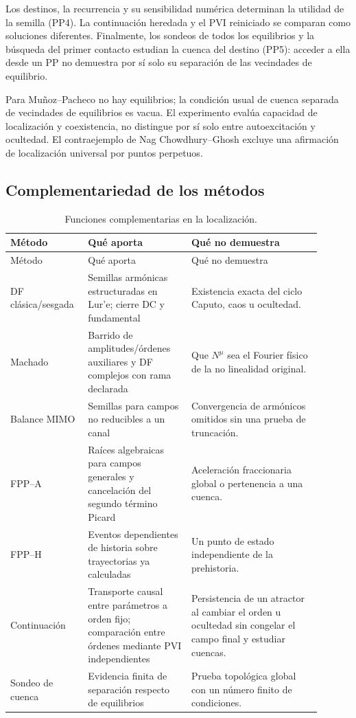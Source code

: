 Los destinos, la recurrencia y su sensibilidad numérica determinan la
utilidad de la semilla (PP4). La continuación heredada y el PVI reiniciado
se comparan como soluciones diferentes. Finalmente, los sondeos de todos los
equilibrios y la búsqueda del primer contacto estudian la cuenca del destino
(PP5): acceder a ella desde un PP no demuestra por sí solo su separación
de las vecindades de equilibrio.

Para Muñoz--Pacheco no hay equilibrios; la condición usual de cuenca separada
de vecindades de equilibrios es vacua. El experimento evalúa capacidad de
localización y coexistencia, no distingue por sí solo entre autoexcitación y
ocultedad. El contraejemplo de Nag Chowdhury--Ghosh excluye una afirmación de
localización universal por puntos perpetuos.

\subsection{Complementariedad de los métodos}

\begin{longtable}{@{}L{0.20\linewidth}L{0.31\linewidth}L{0.39\linewidth}@{}}
\caption{Funciones complementarias en la localización.}
\label{tab:method-complementarity}\\
\toprule
Método & Qué aporta & Qué no demuestra\\
\midrule
\endfirsthead
\toprule
Método & Qué aporta & Qué no demuestra\\
\midrule
\endhead
DF clásica/sesgada & Semillas armónicas estructuradas en Lur'e; cierre DC y
fundamental & Existencia exacta del ciclo Caputo, caos u ocultedad.\\
Machado & Barrido de amplitudes/órdenes auxiliares y DF complejos con rama
declarada & Que \(N^\mu\) sea el Fourier físico de la no linealidad original.\\
Balance MIMO & Semillas para campos no reducibles a un canal & Convergencia de
armónicos omitidos sin una prueba de truncación.\\
FPP--A & Raíces algebraicas para campos generales y cancelación del segundo
término Picard & Aceleración fraccionaria global o pertenencia a una cuenca.\\
FPP--H & Eventos dependientes de historia sobre trayectorias ya calculadas &
Un punto de estado independiente de la prehistoria.\\
Continuación & Transporte causal entre parámetros a orden fijo; comparación
entre órdenes mediante PVI independientes & Persistencia de un atractor al
cambiar el orden u ocultedad sin congelar el campo final y estudiar cuencas.\\
Sondeo de cuenca & Evidencia finita de separación respecto de equilibrios &
Prueba topológica global con un número finito de condiciones.\\
\bottomrule
\end{longtable}

